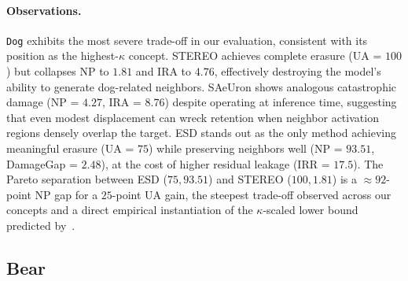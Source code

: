 \paragraph{Observations.}
\texttt{Dog} exhibits the most severe trade-off in our evaluation, consistent with its position as the highest-$\hat\kappa$ concept. STEREO achieves complete erasure (UA = $100$) but collapses NP to $1.81$ and IRA to $4.76$, effectively destroying the model's ability to generate dog-related neighbors. SAeUron shows analogous catastrophic damage (NP = $4.27$, IRA = $8.76$) despite operating at inference time, suggesting that even modest displacement can wreck retention when neighbor activation regions densely overlap the target. ESD stands out as the only method achieving meaningful erasure (UA = $75$) while preserving neighbors well (NP = $93.51$, DamageGap = $2.48$), at the cost of higher residual leakage (IRR = $17.5$). The Pareto separation between ESD ($75, 93.51$) and STEREO ($100, 1.81$) is a $\approx 92$-point NP gap for a $25$-point UA gain, the steepest trade-off observed across our concepts and a direct empirical instantiation of the $\kappa$-scaled lower bound predicted by~.


\subsection{Bear}
\label{app:per_concept_bear}

